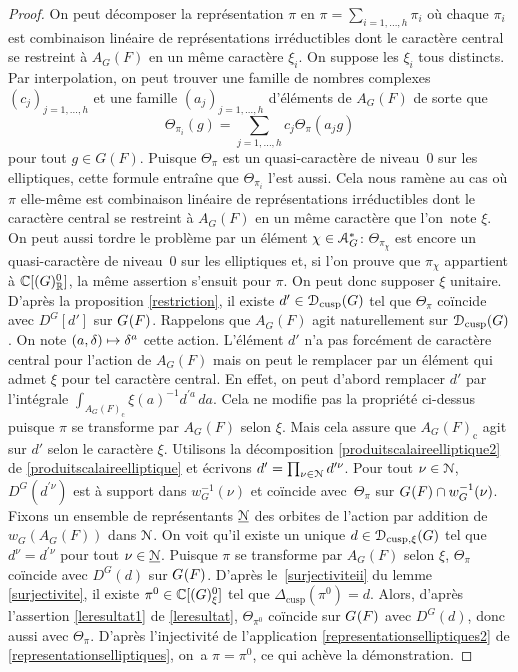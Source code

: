 \documentclass[11pt]{article}
\numberwithin{equation}{section}\providecommand{\og}{«\,}\providecommand{\fg}{\,»}
\let\mathcal \EuScript
\newcommand{\NoChangel}[1]{%
\expandafter\let\csname old\string#1\endcsname=#1
\let#1=\relax
\newcommand{#1}{\mathcode`l="716C\csname old\string#1\endcsname\mathcode`l="7160 }%
}
\newcommand\mto{\mathchoice{\longmapsto}{\mapsto}{\mapsto}{\mapsto}}
\newcommand{\rc}{\mathrm{c}}
\newcommand{\cusp}{\mathrm{cusp}}
\newcommand{\rell}{\mathrm{ell}} \NoChangel{\rell}
\newcommand{\Ell}{\mathrm{Ell}} \NoChangel{\Ell}
\newcommand{\cA}{\mathcal{A}}
\newcommand{\cD}{\mathcal{D}}
\newcommand{\cN}{\mathcal{N}}
\newcommand{\CC}{\mathbb{C}}
\newcommand{\RR}{\mathbb{R}}
\theoremstyle{plain}
\theoremstyle{definition}
\begin{document}
\begin{proof}
On peut décomposer la représentation $\pi$ en $\pi=\sum_{i=1,\dots,h}\pi_{i}$ où chaque $\pi_{i}$ est combinaison linéaire de représentations irréductibles dont le caractère central se restreint à $A_{G}(F)$ en un même caractère $\xi_{i}$. On suppose les $\xi_{i}$ tous distincts. Par interpolation, on peut trouver une famille de nombres complexes $(c_{j})_{j=1,\dots,h}$ et une famille $(a_{j})_{j=1,\dots,h}$ d'éléments de $A_{G}(F)$ de sorte que
\[
\Theta_{\pi_{i}}(g)=\sum_{j=1,\dots,h}c_{j}\Theta_{\pi}(a_{j}g)
\]
pour tout $g\in G(F)$. Puisque $\Theta_{\pi}$ est un quasi-caractère de niveau~$0$ sur les elliptiques, cette formule entraîne que $\Theta_{\pi_{i}}$ l'est aussi. Cela nous ramène au cas où $\pi$ elle-même est combinaison linéaire de représentations irréductibles dont le caractère central se restreint à $A_{G}(F)$ en un même caractère que l'on~note $\xi$. On peut aussi tordre le problème par un élément $\chi\in \cA_{G}^*$: $\Theta_{\pi_{\chi}}$ est encore un quasi-caractère de niveau~$0$ sur les elliptiques et, si l'on prouve que $\pi_{\chi}$ appartient à
$\CC[\Ell(G)^0_{\RR}]$, la même assertion s'ensuit pour $\pi$. On peut donc supposer $\xi$ unitaire. D'après la proposition \ref{restriction}, il existe $d'\in \cD_{\cusp}(G)$ tel que $\Theta_{\pi}$ coïncide avec $D^G[d']$ sur $G_{\rell}(F)$. Rappelons que $A_{G}(F)$ agit naturellement sur $\cD_{\cusp}(G)$. On note $(a,\delta)\mto \delta^{a}$ cette action.
L'élément $d'$ n'a pas forcément de caractère central pour l'action de $A_{G}(F)$ mais on peut le remplacer par un élément qui admet $\xi$ pour tel caractère central. En effet, on peut d'abord remplacer $d'$ par l'intégrale $\int_{A_{G}(F)_{\rc}}\xi(a)^{-1}d^{\prime a} \,da$. Cela ne modifie pas la propriété ci-dessus puisque $\pi$ se transforme par $A_{G}(F)$ selon $\xi$. Mais cela assure que $A_{G}(F)_{\rc}$ agit sur $d'$ selon le caractère $\xi$.
Utilisons la décomposition \eqref{produitscalaireelliptique2} de \ref{produitscalaireelliptique} et écrivons $d'=\prod_{\nu\in \cN}d^{\prime\nu}$. Pour tout $\nu\in \cN$, $D^G(d^{\prime\nu})$ est à support dans $w_{G}^{-1}(\nu)$ et coïncide avec~$\Theta_{\pi}$ sur $G_{\rell}(F)\cap w_{G}^{-1}(\nu)$.
Fixons un ensemble de représentants $\underline{\cN}$ des orbites de l'action par addition de $w_{G}(A_{G}(F))$ dans $\cN$. On voit qu'il existe un unique $ d\in \cD_{\cusp,\xi}(G)$ tel que $ d^{\nu}=d^{\prime\nu}$ pour tout $\nu\in \underline{\cN}$. Puisque $\pi$ se transforme par $A_{G}(F)$ selon $\xi$, $\Theta_{\pi}$ coïncide avec $D^G(d)$ sur $G_{\rell}(F)$. D'après le~\eqref{surjectiviteii} du lemme \ref{surjectivite}, il existe $\pi^0\in \CC[\Ell(G)_{\xi}^0]$ tel que $\Delta_{\cusp}(\pi^0)=d$. Alors, d'après l'assertion \eqref{leresultat1} de \ref{leresultat}, $\Theta_{\pi^0}$ coïncide sur $G_{\rell}(F)$ avec $D^G(d)$, donc aussi avec $\Theta_{\pi}$. D'après l'injectivité de l'application \eqref{representationselliptiques2} de \ref{representationselliptiques}, on~a $\pi=\pi^0$, ce qui achève la démonstration.
\end{proof}
\end{document}
